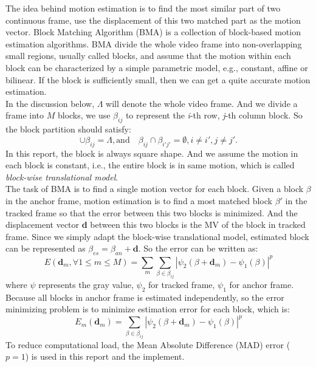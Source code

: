 \documentclass[a4paper, twocolumn]{article}
\begin{document}
	\noindent	
	The idea behind motion estimation is to find the most similar part of two continuous frame, use the displacement of this two matched part as the motion vector.  Block Matching Algorithm (BMA) is a collection of block-based motion estimation algorithms.  BMA divide the whole video frame into non-overlapping small regions, usually called blocks, and assume that the motion within each block can be characterized by a simple parametric model, e.g., constant, affine or bilinear. If the block is sufficiently small, then we can get a quite accurate motion estimation. \\
	In the discussion below, $\Lambda$ will denote the whole video frame. And we divide a frame into $ M $ blocks, we use $ \beta_{ij} $ to represent the \textit{i}-th row, \textit{j}-th column block. So the block partition should satisfy: 
	\begin{displaymath}
		\cup  \beta_{ij} = \Lambda, \textrm{and} \quad \beta_{ij}  \cap \beta_{i'j'} = \emptyset, i \ne i', j \ne j' .
	\end{displaymath}
	In this report, the block is always square shape. And we assume the motion in each block is constant, i.e., the entire block is in same motion, which is called \textit{block-wise translational model}. \\
	The task of BMA is to find a single motion vector for each block. Given a block $ \beta $ in the anchor frame, motion estimation is to find a most matched block $ \beta' $ in the tracked frame so that the error between this two blocks is minimized. And the displacement vector \textbf{d} between this two blocks is the MV of the block in tracked frame. Since we simply adapt the block-wise translational model, estimated block can be represented as $ \beta_{es} = \beta_{an} + \textbf{d} $. So the error can be written as: 
	\begin{displaymath}
		\textit{E}(\textbf{d}_{m}, \forall 1 \leq m \leq M) = \sum_{m} \sum_{\beta \in \beta_{ij}} 
		| \psi_{2}(\beta + \textbf{d}_{m}) - \psi_{1}(\beta) | ^ {p}
	\end{displaymath}
	where $ \psi $ represents the gray value, $ \psi_{2} $ for tracked frame, $ \psi_{1} $ for anchor frame.\\
	Because all blocks in anchor frame is estimated independently, so the error minimizing problem is to minimize estimation error for each block, which is: 
	\begin{equation}
		\label{eq:error}
		\textit{E}_{m}(\textbf{d}_{m}) = \sum_{\beta \in \beta_{ij}} | \psi_{2}(\beta + \textbf{d}_{m}) - \psi_{1}(\beta) | ^{p}
	\end{equation}
	To reduce computational load, the Mean Absolute Difference (MAD) error ( $ p = 1 $) is used in this report and the implement.
\end{document}
